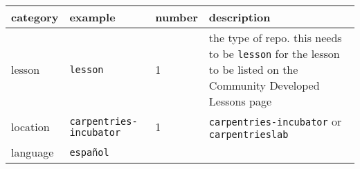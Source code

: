 \documentclass[
]{book}
\begin{document}
\begin{longtable}[]{@{}llll@{}}
\toprule
\begin{minipage}[b]{0.26\columnwidth}\raggedright
category\strut
\end{minipage} & \begin{minipage}[b]{0.26\columnwidth}\raggedright
example\strut
\end{minipage} & \begin{minipage}[b]{0.21\columnwidth}\raggedright
number\strut
\end{minipage} & \begin{minipage}[b]{0.16\columnwidth}\raggedright
description\strut
\end{minipage}\tabularnewline
\midrule
\endhead
\begin{minipage}[t]{0.26\columnwidth}\raggedright
lesson\strut
\end{minipage} & \begin{minipage}[t]{0.26\columnwidth}\raggedright
\texttt{lesson}\strut
\end{minipage} & \begin{minipage}[t]{0.21\columnwidth}\raggedright
1\strut
\end{minipage} & \begin{minipage}[t]{0.16\columnwidth}\raggedright
the type of repo. this needs to be \texttt{lesson} for the lesson to be listed on the Community Developed Lessons page\strut
\end{minipage}\tabularnewline
\begin{minipage}[t]{0.26\columnwidth}\raggedright
location\strut
\end{minipage} & \begin{minipage}[t]{0.26\columnwidth}\raggedright
\texttt{carpentries-incubator}\strut
\end{minipage} & \begin{minipage}[t]{0.21\columnwidth}\raggedright
1\strut
\end{minipage} & \begin{minipage}[t]{0.16\columnwidth}\raggedright
\texttt{carpentries-incubator} or \texttt{carpentrieslab}\strut
\end{minipage}\tabularnewline
\begin{minipage}[t]{0.26\columnwidth}\raggedright
language\strut
\end{minipage} & \begin{minipage}[t]{0.26\columnwidth}\raggedright
\texttt{español}\strut
\end{minipage} & \begin{minipage}[t]{0.21\columnwidth}\raggedright

\end{minipage}
\end{longtable}
\end{document}
